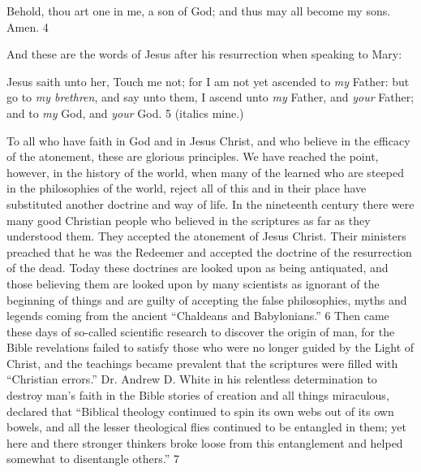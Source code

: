 Behold, thou art one in me, a son of God; and thus may all become my sons. Amen. 4

And these are the words of Jesus after his resurrection when speaking to Mary:

Jesus saith unto her, Touch me not; for I am not yet ascended to \textit{my} Father: but go to \textit{my
brethren}, and say unto them, I ascend unto \textit{my} Father, and \textit{your} Father; and to \textit{my} God, and
\textit{your} God. 5 (italics mine.)

To all who have faith in God and in Jesus Christ, and who believe in the efficacy of the
atonement, these are glorious principles. We have reached the point, however, in the history
of the world, when many of the learned who are steeped in the philosophies of the world,
reject all of this and in their place have substituted another doctrine and way of life. In the
nineteenth century there were many good Christian people who believed in the scriptures as
far as they understood them. They accepted the atonement of Jesus Christ. Their ministers
preached that he was the Redeemer and accepted the doctrine of the resurrection of the dead.
Today these doctrines are looked upon as being antiquated, and those believing them are
looked upon by many scientists as ignorant of the beginning of things and are guilty of
accepting the false philosophies, myths and legends coming from the ancient ``Chaldeans and
Babylonians.'' 6 Then came these days of so-called scientific research to discover the origin
of man, for the Bible revelations failed to satisfy those who were no longer guided by the
Light of Christ, and the teachings became prevalent that the scriptures were filled with
``Christian errors.'' Dr. Andrew D. White in his relentless determination to destroy man's faith
in the Bible stories of creation and all things miraculous, declared that ``Biblical theology
continued to spin its own webs out of its own bowels, and all the lesser theological flies
continued to be entangled in them; yet here and there stronger thinkers broke loose from this
entanglement and helped somewhat to disentangle others.'' 7

